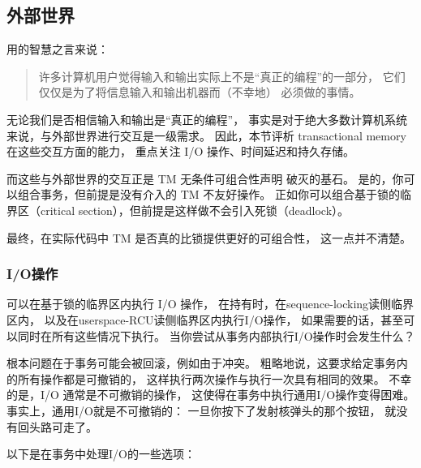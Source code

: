\subsection{外部世界}
\label{sec:future:Outside World}

用的智慧之言来说：

\begin{quote}
	许多计算机用户觉得输入和输出实际上不是``真正的编程''的一部分，
	它们仅仅是为了将信息输入和输出机器而（不幸地）
	必须做的事情。
\end{quote}

无论我们是否相信输入和输出是``真正的编程''，
事实是对于绝大多数计算机系统来说，与外部世界进行交互是一级需求。
因此，本节评析 transactional memory 在这些交互方面的能力，
重点关注 I/O 操作、时间延迟和持久存储。

而这些与外部世界的交互正是 TM 无条件可组合性声明
破灭的基石。
是的，你可以组合事务，但前提是没有介入的 TM 不友好操作。
正如你可以组合基于锁的临界区（critical section），但前提是这样做不会引入死锁（deadlock）。

最终，在实际代码中 TM 是否真的比锁提供更好的可组合性，
这一点并不清楚。

\subsubsection{I/O操作}
\label{sec:future:I/O Operations}

可以在基于锁的临界区内执行 I/O 操作，
在持有时，在sequence-locking读侧临界区内，
以及在userspace-RCU读侧临界区内执行I/O操作，
如果需要的话，甚至可以同时在所有这些情况下执行。
当你尝试从事务内部执行I/O操作时会发生什么？

根本问题在于事务可能会被回滚，例如由于冲突。
粗略地说，这要求给定事务内的所有操作都是可撤销的，
这样执行两次操作与执行一次具有相同的效果。
不幸的是，I/O 通常是不可撤销的操作，
这使得在事务中执行通用I/O操作变得困难。
事实上，通用I/O就是不可撤销的：
一旦你按下了发射核弹头的那个按钮，
就没有回头路可走了。

以下是在事务中处理I/O的一些选项：


